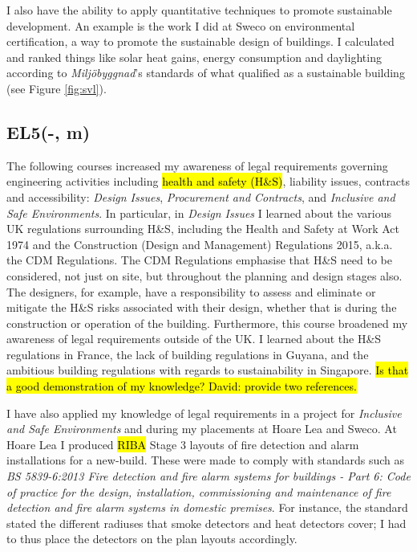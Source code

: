 I also have the ability to apply quantitative techniques to promote sustainable development.
An example is the work I did at Sweco on environmental certification, a way to promote the sustainable design of buildings.
I calculated and ranked things like solar heat gains, energy consumption and daylighting according to \textit{Miljöbyggnad}'s standards of what qualified as a sustainable building (see Figure \ref{fig:svl}).





\subsection*{EL5(-, m)}

The following courses increased my awareness of legal requirements governing engineering activities including \hl{health and safety (H\&S)}, liability issues, contracts and accessibility:
\textit{Design Issues},
\textit{Procurement and Contracts},
and \textit{Inclusive and Safe Environments}.
In particular, in \textit{Design Issues} I learned about the various UK regulations surrounding H\&S, including the Health and Safety at Work Act 1974 and the Construction (Design and Management) Regulations 2015, a.k.a. the CDM Regulations.
The CDM Regulations emphasise that H\&S need to be considered, not just on site, but throughout the planning and design stages also.
The designers, for example, have a responsibility to assess and eliminate or mitigate the H\&S risks associated with their design, whether that is during the construction or operation of the building.
Furthermore, this course broadened my awareness of legal requirements outside of the UK.
I learned about the H\&S regulations in France, the lack of building regulations in Guyana, and the ambitious building regulations with regards to sustainability in Singapore.
\hl{Is that a good demonstration of my knowledge? David: provide two references.}

I have also applied my knowledge of legal requirements in a project for \textit{Inclusive and Safe Environments} and during my placements at Hoare Lea and Sweco.
At Hoare Lea I produced \hl{RIBA} Stage 3 layouts of fire detection and alarm installations for a new-build.
These were made to comply with standards such as \textit{BS 5839-6:2013 Fire detection and fire alarm systems for buildings - Part 6: Code of practice for the design, installation, commissioning and maintenance of fire detection and fire alarm systems in domestic premises}.
For instance, the standard stated the different radiuses that smoke detectors and heat detectors cover; I had to thus place the detectors on the plan layouts accordingly.


